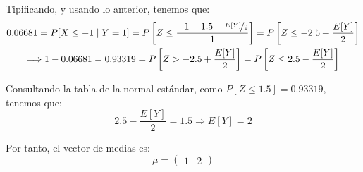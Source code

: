 \begin{ejercicio}
    Tipificando, y usando lo anterior, tenemos que:
    \begin{multline*}
        0.06681 = P[X\leq -1\mid Y=1] = P\left[Z\leq \dfrac{-1-1.5+\nicefrac{E[Y]}{2}}{1}\right] = P\left[Z\leq -2.5+\frac{E[Y]}{2}\right]
        \\\Longrightarrow
        1-0.06681 = 0.93319 = P\left[Z>-2.5+\frac{E[Y]}{2}\right] = P\left[Z\leq 2.5-\frac{E[Y]}{2}\right]
    \end{multline*}

    Consultando la tabla de la normal estándar, como $P[Z\leq 1.5]=0.93319$, tenemos que:
    \begin{equation*}
        2.5-\frac{E[Y]}{2} = 1.5 \Longrightarrow E[Y] = 2
    \end{equation*}

    Por tanto, el vector de medias es:
    \begin{equation*}
        \mu = \begin{pmatrix}
            1&
            2
        \end{pmatrix}
    \end{equation*}
\end{ejercicio}